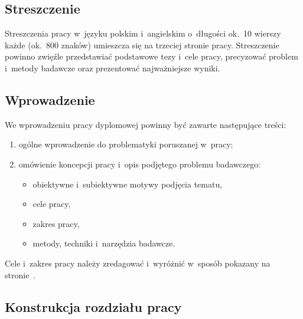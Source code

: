 \documentclass[skorowidz,skroty]{dyplomWEZUT}
\begin{document}
\subsection{Streszczenie}\label{subsec:streszczenie}

Streszczenia pracy w~języku polskim i~angielskim o~długości ok.~10 wierszy każde (ok.~800 znaków) umieszcza się na trzeciej stronie pracy. Streszczenie powinno zwięźle przedstawiać podstawowe tezy i~cele pracy, precyzować problem i~metody badawcze oraz prezentować najważniejsze wyniki.

\subsection{Wprowadzenie}\label{subsec:wprowadzenie}

We wprowadzeniu pracy dyplomowej powinny być zawarte następujące treści:

\begin{enumerate}
    \item ogólne wprowadzenie do problematyki poruszanej w~pracy;
    \item omówienie koncepcji pracy i~opis podjętego problemu badawczego:
        \begin{itemize}
            \item obiektywne i~subiektywne motywy podjęcia tematu,
            \item cele pracy,
            \item zakres pracy,
            \item metody, techniki i~narzędzia badawcze.
        \end{itemize}
\end{enumerate}

\noindent Cele i~zakres pracy należy zredagować i~wyróżnić w~sposób pokazany na
stronie~\pageref{cel}.

\subsection{Konstrukcja rozdziału pracy}\label{subsec:konstrukcja}
\end{document}
